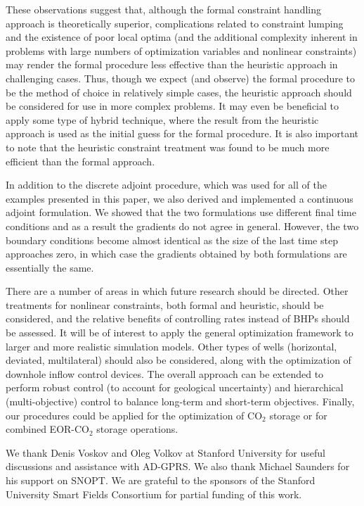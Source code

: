 \documentclass[twocolumn,numbook]{svjour3}          %
\begin{document}
These observations suggest that, although the formal constraint handling approach is theoretically superior, complications related to constraint lumping and the existence of poor local optima (and the additional complexity inherent in problems with large numbers of optimization variables and nonlinear constraints) may render the formal procedure less effective than the heuristic approach in challenging cases. Thus, though we expect (and observe) the formal procedure to be the method of choice in relatively simple cases, the heuristic approach should be considered for use in more complex problems. It may even be beneficial to apply some type of hybrid technique, where the result from the heuristic approach is used as the initial guess for the formal procedure. It is also important to note that the heuristic constraint treatment was found to be much more efficient than the formal approach. 


In addition to the discrete adjoint procedure, which was used for all of the
examples presented in this paper, we also derived and implemented a continuous
adjoint formulation. We showed that the two formulations use different
final time conditions and as a result the gradients do not
agree in general. However, the two boundary conditions become almost identical as the
size of the last time step approaches zero, in which case the gradients obtained by
both formulations are essentially the same.

There are a number of areas in which future research should be directed. Other
treatments for nonlinear constraints, both formal and heuristic, should be
considered, and the relative benefits of controlling rates instead of BHPs
should be assessed. It will be of interest to apply the general optimization
framework to larger and more realistic simulation models. Other types of wells
(horizontal, deviated, multilateral) should also be considered, along with the
optimization of downhole inflow control devices. The overall approach can be 
extended to perform robust control (to account for geological uncertainty) and hierarchical
(multi-objective) control to balance long-term and short-term objectives. Finally, our procedures could be applied for the optimization of CO$_2$ storage or for combined
EOR-CO$_2$ storage operations.



\begin{acknowledgements} 
We thank Denis Voskov and Oleg Volkov at Stanford
University for useful discussions and assistance with AD-GPRS.
We also thank Michael Saunders for his support 
on SNOPT. We are grateful
to the sponsors of the Stanford University Smart Fields Consortium for partial
funding of this work.
\end{acknowledgements}




\end{document}
